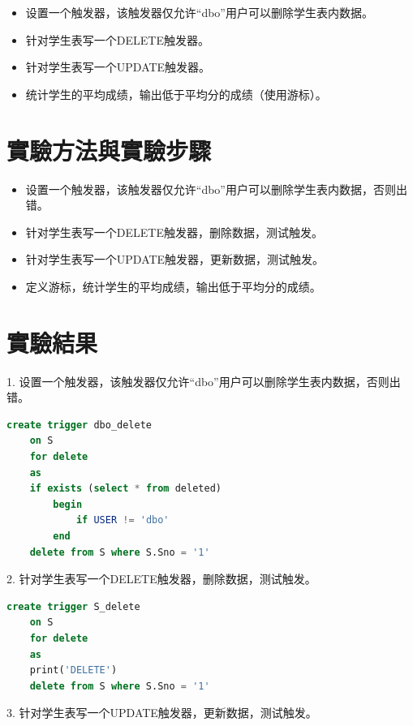 \documentclass[12pt, a4paper]{report}
\begin{document}
\begin{itemize}
    \item 设置一个触发器，该触发器仅允许“dbo”用户可以删除学生表内数据。
    \item 针对学生表写一个DELETE触发器。
    \item 针对学生表写一个UPDATE触发器。
    \item 统计学生的平均成绩，输出低于平均分的成绩（使用游标）。
\end{itemize}

\section{實驗方法與實驗步驟}

\begin{itemize}
    \item 设置一个触发器，该触发器仅允许“dbo”用户可以删除学生表内数据，否则出错。
    \item 针对学生表写一个DELETE触发器，删除数据，测试触发。
    \item 针对学生表写一个UPDATE触发器，更新数据，测试触发。
    \item 定义游标，统计学生的平均成绩，输出低于平均分的成绩。
\end{itemize}

\section{實驗結果}

1. 设置一个触发器，该触发器仅允许“dbo”用户可以删除学生表内数据，否则出错。

\begin{lstlisting}[language=SQL]
    create trigger dbo_delete
    on S
    for delete
    as
	if exists (select * from deleted)
		begin
			if USER != 'dbo'
		end
	delete from S where S.Sno = '1'
\end{lstlisting}

2. 针对学生表写一个DELETE触发器，删除数据，测试触发。

\begin{lstlisting}[language=SQL]
    create trigger S_delete
    on S
    for delete
    as
	print('DELETE')
    delete from S where S.Sno = '1'
\end{lstlisting}

3. 针对学生表写一个UPDATE触发器，更新数据，测试触发。
\end{document}
